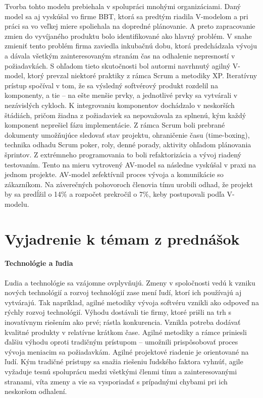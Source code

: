 \documentclass[10pt,twoside,slovak,a4paper]{article}
\begin{document}
Tvorba tohto modelu prebiehala v spolupráci mnohými organizáciami. Daný model sa aj vyskúšal vo firme BBT, ktorá sa predtým riadila V-modelom a pri práci sa vo veľkej miere spoliehala na dopredné plánovanie. A preto zapracovanie zmien do vyvíjaného produktu bolo identifikované ako hlavný problém. V snahe zmieniť tento problém firma zaviedla inkubačnú dobu, ktorá predchádzala vývoju a dávala všetkým zainteresovaným stranám čas na odhalenie nepresností v požiadavkách. S ohľadom tieto skutočnosti bol autormi navrhnutý agilný V-model, ktorý prevzal niektoré praktiky z rámca Scrum a metodiky XP. Iteratívny prístup spočíval v tom, že sa výsledný softvérový produkt rozdelil na komponenty, a tie – na ešte menšie prvky, a jednotlivé prvky sa vytvárali v nezávislých cykloch. K integrovaniu komponentov dochádzalo v neskorších štádiách, pričom žiadna z požiadaviek sa nepovažovala za splnenú, kým každý komponent neprešiel fázu implementácie. Z rámca Scrum boli prebrané dokumenty umožňujúce sledovať stav projektu, ohraničenie času (time-boxing), technika odhadu Scrum poker, roly, denné porady, aktivity ohľadom plánovania šprintov. Z extrémneho programovania to boli refaktorizácia a vývoj riadený testovaním. Tento na mieru vytrovený AV-model sa následne vyskúšal v praxi na jednom projekte. AV-model zefektívnil proces vývoja a komunikácie so zákazníkom. Na záverečných pohovoroch členovia tímu urobili odhad, že projekt by sa predĺžil o 14\% a rozpočet prekročil o 7\%, keby postupovali podľa V-modelu\cite{AVmodelPrax}.

\section{Vyjadrenie k témam z prednášok}
\paragraph{Technológie a ľudia} 
Ľudia a technológie sa vzájomne ovplyvňujú. Zmeny v spoločnosti vedú k vzniku nových technológií a rozvoj technológií zase mení ľudí, ktorí ich používajú aj vytvárajú. Tak napríklad, agilné metodiky vývoja softvéru vznikli ako odpoveď na rýchly rozvoj technológií. Výhodu dostávali tie firmy, ktoré prišli na trh s inovatívnym riešením ako prvé; rástla konkurencia. Vznikla potreba dodávať kvalitné produkty v relatívne krátkom čase. Agilné metodiky a rámce priniesli ďalšiu výhodu oproti tradičným prístupom – umožnili prispôsobovať proces vývoja meniacim sa požiadavkám. Agilné projektové riadenie je orientované na ľudí. Kým tradičné prístupy sa snažia riešeniu ľudského faktora vyhnúť, agile vyžaduje tesnú spoluprácu medzi všetkými členmi tímu a zainteresovanými stranami, víta zmeny a vie sa vysporiadať s prípadnými chybami pri ich neskoršom odhalení.
\end{document}

